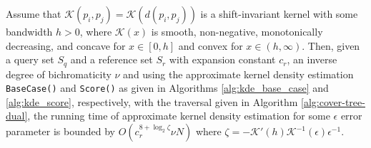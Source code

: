 \begin{thm}
Assume that $\mathcal{K}(p_i, p_j) = \mathcal{K}\left(d(p_i, p_j)\right)$ is a shift-invariant kernel with some bandwidth $h > 0$, where $\mathcal{K}(x)$ is smooth, non-negative, monotonically decreasing, and concave for $x \in [0, h]$ and convex for $x \in (h, \infty)$. Then, given a query set $S_q$ and a reference set $S_r$ with
expansion constant $c_r$, an inverse degree of bichromaticity $\nu$ and using the
approximate kernel density estimation \texttt{BaseCase()} and \texttt{Score()}
as given in Algorithms \ref{alg:kde_base_case} and \ref{alg:kde_score},
respectively, with the traversal given in Algorithm \ref{alg:cover-tree-dual},
the running time of approximate kernel density estimation for some $\epsilon$
error parameter is bounded by
$O(c_r^{8 + \log_2 \zeta} \nu N)$
where $\zeta = -\mathcal{K}'(h) \mathcal{K}^{-1}(\epsilon) \epsilon^{-1}$.

\label{thm:kde-bound}
\end{thm}

